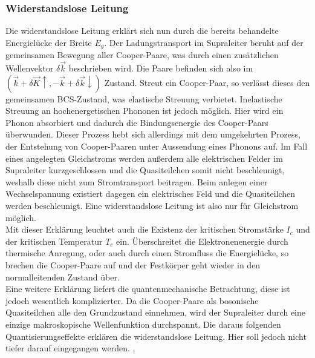 		\subsubsection{Widerstandslose Leitung}
Die widerstandslose Leitung erklärt sich nun durch die bereits behandelte 
Energielücke der Breite $E_g$. Der Ladungstransport im Supraleiter beruht auf
der gemeinsamen Bewegung aller Cooper-Paare, was durch einen zusätzlichen 
Wellenvektor $\delta \vec{k}$ beschrieben wird. Die Paare befinden sich also
im $(\vec{k} + \delta \vec{K} \uparrow, - \vec{k} + \delta \vec{k} \downarrow)$
Zustand. Streut ein Cooper-Paar, so verlässt dieses den gemeinsamen BCS-Zustand,
was elastische Streuung verbietet. Inelastische Streuung an hochenergetischen
Phononen ist jedoch möglich. Hier wird ein Phonon absorbiert und dadurch die 
Bindungsenergie des Cooper-Paars überwunden. Dieser Prozess hebt sich allerdings
mit dem umgekehrten Prozess, der Entstehung von Cooper-Paaren unter Aussendung eines
Phonons auf. Im Fall eines angelegten Gleichstroms werden außerdem alle 
elektrischen Felder im Supraleiter kurzgeschlossen und die Quasiteilchen somit nicht
beschleunigt, weshalb diese nicht zum Stromtransport beitragen. Beim anlegen einer
Wechselspannung existiert dagegen ein elektrisches Feld und die Quasiteilchen werden
beschleunigt. Eine widerstandslose Leitung ist also nur für Gleichstrom möglich.\\
Mit dieser Erklärung leuchtet auch die Existenz der kritischen Stromstärke $I_c$ 
und der kritischen Temperatur $T_c$ ein. Überschreitet die Elektronenenergie durch
thermische Anregung, oder auch durch einen Stromfluss die Energielücke, so brechen
die Cooper-Paare auf und der Festkörper geht wieder in den normalleitenden Zustand
über.\\
Eine weitere Erklärung liefert die quantenmechanische Betrachtung, diese ist jedoch
wesentlich komplizierter. Da die Cooper-Paare als bosonische Quasiteilchen alle den
Grundzustand einnehmen, wird der Supraleiter durch eine einzige makroskopische 
Wellenfunktion durchspannt. Die daraus folgenden Quantisierungseffekte erklären 
die widerstandslose Leitung. Hier soll jedoch nicht tiefer darauf eingegangen
werden.
\cite{hunklinger}, \cite{suprawiki}

